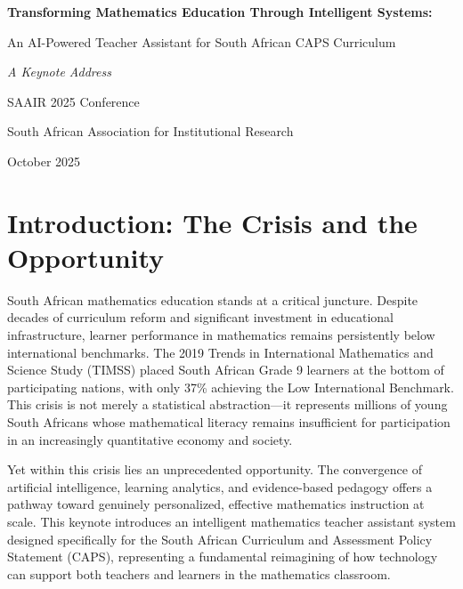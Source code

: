 \documentclass[12pt,a4paper]{article}
\begin{document}
\begin{titlepage}
    \centering
    \vspace*{2cm}
    {\Huge\bfseries Transforming Mathematics Education Through Intelligent Systems:\par}
    \vspace{0.5cm}
    {\Large An AI-Powered Teacher Assistant for South African CAPS Curriculum\par}
    \vspace{2cm}
    {\large\itshape A Keynote Address\par}
    \vspace{1cm}
    {\large SAAIR 2025 Conference\par}
    \vspace{0.5cm}
    {\large South African Association for Institutional Research\par}
    \vfill
    {\large October 2025\par}
\end{titlepage}

\newpage
\tableofcontents
\newpage

\section{Introduction: The Crisis and the Opportunity}

South African mathematics education stands at a critical juncture. Despite decades of curriculum reform and significant investment in educational infrastructure, learner performance in mathematics remains persistently below international benchmarks. The 2019 Trends in International Mathematics and Science Study (TIMSS) placed South African Grade 9 learners at the bottom of participating nations, with only 37\% achieving the Low International Benchmark. This crisis is not merely a statistical abstraction---it represents millions of young South Africans whose mathematical literacy remains insufficient for participation in an increasingly quantitative economy and society.

Yet within this crisis lies an unprecedented opportunity. The convergence of artificial intelligence, learning analytics, and evidence-based pedagogy offers a pathway toward genuinely personalized, effective mathematics instruction at scale. This keynote introduces an intelligent mathematics teacher assistant system designed specifically for the South African Curriculum and Assessment Policy Statement (CAPS), representing a fundamental reimagining of how technology can support both teachers and learners in the mathematics classroom.
\end{document}

